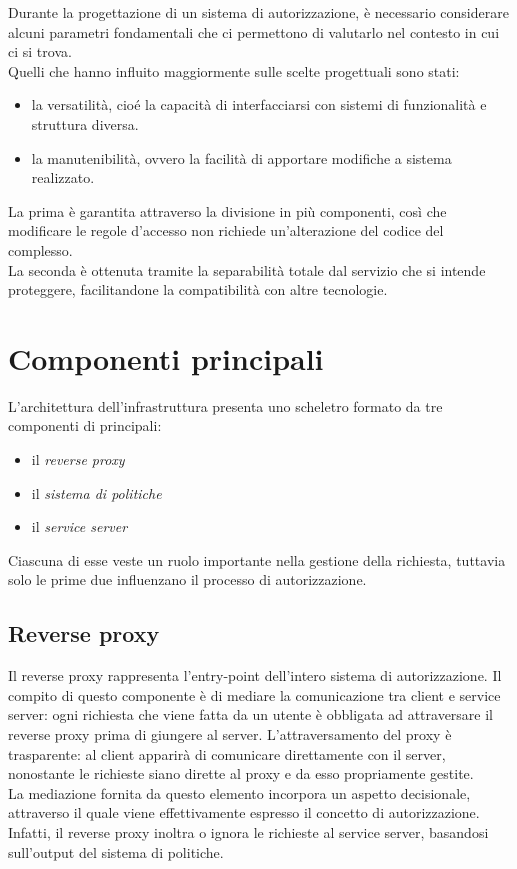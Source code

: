 Durante la progettazione di un sistema di autorizzazione, è necessario considerare alcuni parametri fondamentali che ci permettono di valutarlo 
nel contesto in cui ci si trova.
\\ Quelli che hanno influito maggiormente sulle scelte progettuali sono stati:
\begin{itemize}
    \item la versatilità, cioé la capacità di interfacciarsi con sistemi di 
    funzionalità e struttura diversa.
    \item la manutenibilità, ovvero la facilità di apportare modifiche a sistema realizzato.
\end{itemize}
La prima è garantita attraverso la divisione in più componenti, così che modificare le regole d'accesso non richiede 
un'alterazione del codice del complesso. 
\\ La seconda è ottenuta tramite la separabilità totale dal servizio che si intende proteggere,
 facilitandone la compatibilità con altre tecnologie.   

\section{Componenti principali}

L'architettura dell'infrastruttura presenta uno scheletro formato da tre componenti di principali: 
\begin{itemize}
    \item il \textit{reverse proxy}
    \item il \textit{sistema di politiche}
    \item il \textit{service server}
\end{itemize}
Ciascuna di esse veste un ruolo importante nella gestione della richiesta, tuttavia solo le prime due influenzano il processo di autorizzazione. 

\subsection{Reverse proxy}
Il reverse proxy rappresenta l'entry-point dell'intero sistema di autorizzazione. Il compito di questo componente è di
mediare la comunicazione tra client e service server: ogni richiesta che viene fatta da un utente è obbligata ad attraversare 
il reverse proxy prima di giungere al server. 
L'attraversamento del proxy è trasparente: al client apparirà di comunicare direttamente con il server, nonostante le richieste siano dirette al proxy e da esso propriamente gestite. 
\\ La mediazione fornita da questo elemento incorpora un aspetto decisionale, attraverso il quale viene effettivamente espresso il concetto di autorizzazione. 
Infatti, il reverse proxy inoltra o ignora le richieste al service server, basandosi sull'output del sistema di politiche.  
 
